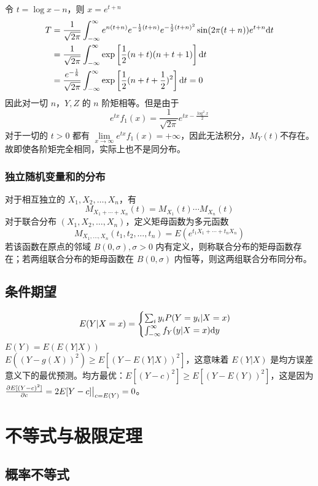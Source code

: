 \documentclass[./main.tex]{subfiles}
\begin{document}
令 $t=\log x-n$，则 $x=e^{t+n}$
\begin{align*}
    T&=\frac{1}{\sqrt{2\pi}}\int_{-\infty}^{\infty}e^{n(t+n)}e^{-\frac{1}{2}(t+n)}e^{-\frac{1}{2}(t+n)^2}\sin(2\pi(t+n))e^{t+n}\text{d}t\\
    &=\frac{1}{\sqrt{2\pi}}\int_{-\infty}^{\infty}\exp\left[\frac{1}{2}(n+t)(n+t+1)\right]\text{d}t\\
    &=\frac{e^{-\frac{1}{8}}}{\sqrt{2\pi}}\int_{-\infty}^{\infty}\exp\left[\frac{1}{2}(n+t+\frac{1}{2})^2\right]\text{d}t=0
\end{align*}
因此对一切 $n$，$Y,Z$ 的 $n$ 阶矩相等。但是由于 $$e^{tx}f_1(x)=\frac{1}{\sqrt{2\pi}}e^{tx-\frac{\log^2x}{2}}$$ 对于一切的 $t>0$ 都有 $\lim\limits_{x\rightarrow\infty}e^{tx}f_1(x)=+\infty$，因此无法积分，$M_Y(t)$不存在。故即使各阶矩完全相同，实际上也不是同分布。
\subsubsection{独立随机变量和的分布}
对于相互独立的 $X_1,X_2,\dots,X_n$，有
\begin{equation}
    M_{X_1+\cdots+X_n}(t)=M_{X_1}(t)\cdots M_{X_n}(t)
\end{equation}
\indent 对于联合分布 $(X_1,X_2,\dots,X_n)$，定义矩母函数为多元函数
\begin{equation}
    M_{X_1,\dots,X_n}(t_1,t_2,\dots,t_n)=E(e^{t_1X_1+\cdots+t_nX_n})
\end{equation}
若该函数在原点的邻域 $B(0,\sigma),\sigma>0$ 内有定义，则称联合分布的矩母函数存在；若两组联合分布的矩母函数在 $B(0,\sigma)$ 内恒等，则这两组联合分布同分布。
\subsection{条件期望}
$$E(Y|X=x)=\begin{cases}\sum_iy_iP(Y=y_i|X=x)\\\int_{-\infty}^{\infty}f_Y(y|X=x)\text{d}y\end{cases}$$
$E(Y)=E(E(Y|X))$\\
$E((Y-g(X))^2)\ge E[(Y-E(Y|X))^2]$，这意味着 $E(Y|X)$ 是均方误差意义下的最优预测。均方最优：$E[(Y-c)^2]\ge E[(Y-E(Y))^2]$，这是因为 $\frac{\partial E[(Y-c)^2]}{\partial c}=2E[Y-c]\big|_{c=E(Y)}=0$。
\section{不等式与极限定理}
\subsection{概率不等式}
\end{document}

